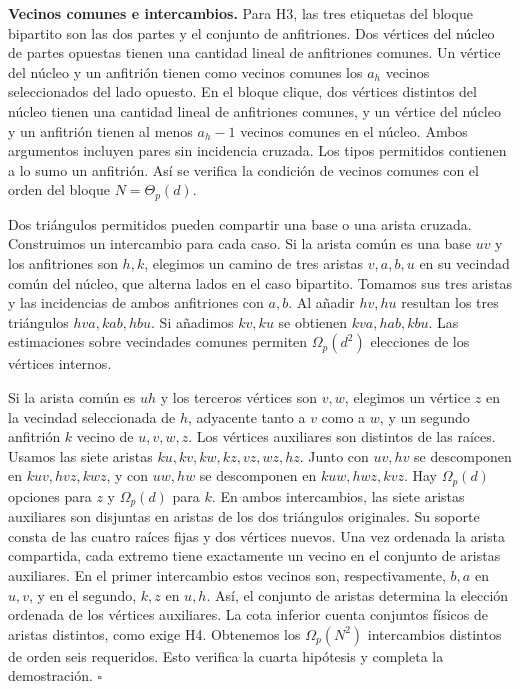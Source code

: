 \documentclass[spanish,11pt,a4paper]{article}
\begin{document}
\textbf{Vecinos comunes e intercambios.} Para H3, las tres etiquetas del bloque bipartito son las dos partes y el conjunto de anfitriones. Dos vértices del núcleo de partes opuestas tienen una cantidad lineal de anfitriones comunes. Un vértice del núcleo y un anfitrión tienen como vecinos comunes los \(a_h\) vecinos seleccionados del lado opuesto. En el bloque clique, dos vértices distintos del núcleo tienen una cantidad lineal de anfitriones comunes, y un vértice del núcleo y un anfitrión tienen al menos \(a_h-1\) vecinos comunes en el núcleo. Ambos argumentos incluyen pares sin incidencia cruzada. Los tipos permitidos contienen a lo sumo un anfitrión. Así se verifica la condición de vecinos comunes con el orden del bloque \(N=\Theta_p(d)\).

Dos triángulos permitidos pueden compartir una base o una arista cruzada. Construimos un intercambio para cada caso. Si la arista común es una base \(uv\) y los anfitriones son \(h,k\), elegimos un camino de tres aristas \(v,a,b,u\) en su vecindad común del núcleo, que alterna lados en el caso bipartito. Tomamos sus tres aristas y las incidencias de ambos anfitriones con \(a,b\). Al añadir \(hv,hu\) resultan los tres triángulos \(hva,kab,hbu\). Si añadimos \(kv,ku\) se obtienen \(kva,hab,kbu\). Las estimaciones sobre vecindades comunes permiten \(\Omega_p(d^2)\) elecciones de los vértices internos.

Si la arista común es \(uh\) y los terceros vértices son \(v,w\), elegimos un vértice \(z\) en la vecindad seleccionada de \(h\), adyacente tanto a \(v\) como a \(w\), y un segundo anfitrión \(k\) vecino de \(u,v,w,z\). Los vértices auxiliares son distintos de las raíces. Usamos las siete aristas \(ku,kv,kw,kz,vz,wz,hz\). Junto con \(uv,hv\) se descomponen en \(kuv,hvz,kwz\), y con \(uw,hw\) se descomponen en \(kuw,hwz,kvz\). Hay \(\Omega_p(d)\) opciones para \(z\) y \(\Omega_p(d)\) para \(k\). En ambos intercambios, las siete aristas auxiliares son disjuntas en aristas de los dos triángulos originales. Su soporte consta de las cuatro raíces fijas y dos vértices nuevos. Una vez ordenada la arista compartida, cada extremo tiene exactamente un vecino en el conjunto de aristas auxiliares. En el primer intercambio estos vecinos son, respectivamente, \(b,a\) en \(u,v\), y en el segundo, \(k,z\) en \(u,h\). Así, el conjunto de aristas determina la elección ordenada de los vértices auxiliares. La cota inferior cuenta conjuntos físicos de aristas distintos, como exige H4. Obtenemos los \(\Omega_p(N^2)\) intercambios distintos de orden seis requeridos. Esto verifica la cuarta hipótesis y completa la demostración. \(\square\)
\end{document}

